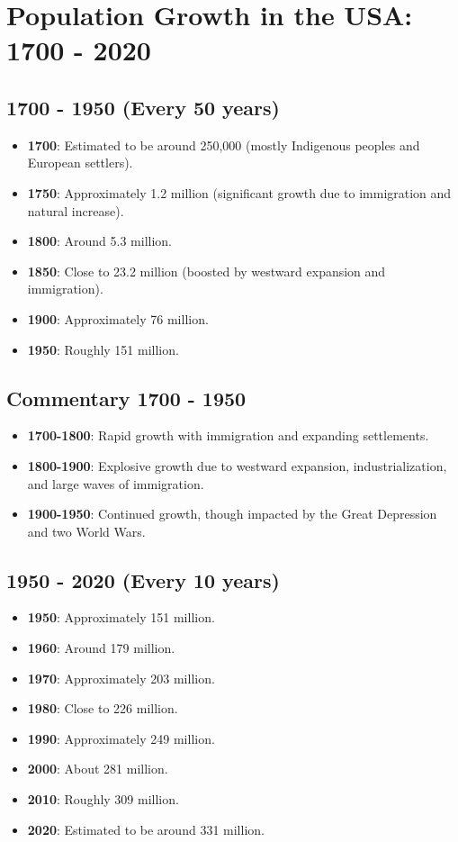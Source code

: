 \section*{Population Growth in the USA: 1700 - 2020}

\subsection*{1700 - 1950 (Every 50 years)}
\begin{itemize}
    \item \textbf{1700}: Estimated to be around 250,000 (mostly Indigenous peoples and European settlers).
    \item \textbf{1750}: Approximately 1.2 million (significant growth due to immigration and natural increase).
    \item \textbf{1800}: Around 5.3 million.
    \item \textbf{1850}: Close to 23.2 million (boosted by westward expansion and immigration).
    \item \textbf{1900}: Approximately 76 million.
    \item \textbf{1950}: Roughly 151 million.
\end{itemize}

\subsection*{Commentary 1700 - 1950}
\begin{itemize}
    \item \textbf{1700-1800}: Rapid growth with immigration and expanding settlements.
    \item \textbf{1800-1900}: Explosive growth due to westward expansion, industrialization, and large waves of immigration.
    \item \textbf{1900-1950}: Continued growth, though impacted by the Great Depression and two World Wars.
\end{itemize}

\subsection*{1950 - 2020 (Every 10 years)}
\begin{itemize}
    \item \textbf{1950}: Approximately 151 million.
    \item \textbf{1960}: Around 179 million.
    \item \textbf{1970}: Approximately 203 million.
    \item \textbf{1980}: Close to 226 million.
    \item \textbf{1990}: Approximately 249 million.
    \item \textbf{2000}: About 281 million.
    \item \textbf{2010}: Roughly 309 million.
    \item \textbf{2020}: Estimated to be around 331 million.
\end{itemize}

